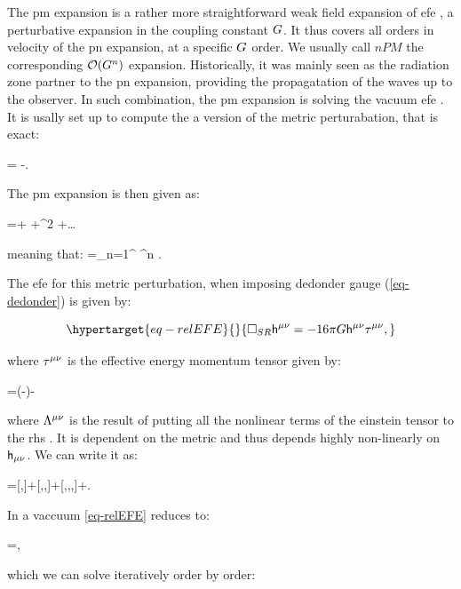 \documentclass[
  10pt,
  a4paper,
  DIV=11,
  numbers=noendperiod,
  oneside]{scrreprt}
\let\[\relax \let\]\relax %
\DeclareRobustCommand{\[}{\begin{equation}}
\DeclareRobustCommand{\]}{\end{equation}}
\begin{document}
The \gls{pm} expansion is a rather more straightforward weak field
expansion of \gls{efe} , a perturbative expansion in the coupling
constant \(\grav\). It thus covers all orders in velocity of the
\gls{pn} expansion, at a specific \(\grav\) order. We usually call
\(nPM\) the corresponding \(\order[n]{\grav}\) expansion. Historically,
it was mainly seen as the radiation zone partner to the \gls{pn}
expansion, providing the propagatation of the waves up to the observer.
In such combination, the \gls{pm} expansion is solving the vacuum
\gls{efe} . It is usally set up to compute the a version of the metric
perturabation, that is exact:

\[\pertmet=\sqrt{-\metricTensor} \invmet-\invmink.\]

The \gls{pm} expansion is then given as:

\[
\sqrt{-\metricTensor} \invmet=\invmink+ \grav {}+\grav^2 +\ldots
\]

meaning that: \[
\invpertmet=\sum\limits_{n=1}^{\infty} \grav^n  .
\]

The \gls{efe} for this metric perturbation, when imposing dedonder gauge
(\ref{eq-dedonder}) is given by:

\begin{equation}\protect\hypertarget{eq-relEFE}{}{
\SRDA \invpertmet=-16 \pi \grav \invpertmet \relSEct ,
}\label{eq-relEFE}\end{equation}

where \(\relSEct\) is the effective energy momentum tensor given by:

\[
\relSEct=(-\metricTensor)\SEct -\inv{16 \pi \grav}\ct[\mu\nu]{\Lambda}
\]

where \(\ct[\mu\nu]{\Lambda}\) is the result of putting all the
nonlinear terms of the einstein tensor to the \gls{rhs} . It is
dependent on the metric and thus depends highly non-linearly on
\(\pertmet\). We can write it as:

\[
\ct[\mu\nu]{\Lambda}=[\pertTensor,\pertTensor]+[\pertTensor,\pertTensor,\pertTensor]+[\pertTensor,\pertTensor,\pertTensor,\pertTensor]+\order[5]{\pertTensor}.
\]

In a vaccuum \ref{eq-relEFE} reduces to:

\[
\SRDA \invpertmet=\ct[\mu\nu]{\Lambda},
\]

which we can solve iteratively order by order:
\end{document}
